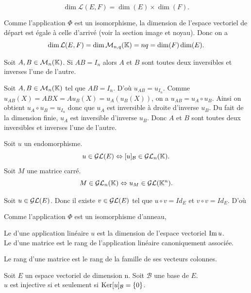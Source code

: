 \documentclass{book}
\begin{document}
\begin{Corollaire}
$$\dim \mathcal{L}(E,F) = \dim(E) \times\dim(F).$$
\end{Corollaire}
\begin{Demonstration}
Comme l'application $\Phi$ est un isomorphisme, la dimension de l'espace vectoriel de départ est égale à celle d'arrivé (voir la section image et noyau). Donc on a $$\dim \mathcal{L}(E,F)=\dim \M{n}{q}{\K}= n q= \dim (F)\dim (E).$$ 
\end{Demonstration}

\begin{Proposition}
Soit $A,B\in \MnK$.
Si $AB=I_n$ alors $A$ et $B$ sont toutes deux inversibles et inverses l'une de l'autre.
\end{Proposition}
\begin{Demonstration}
Soit $A,B\in \MnK$ tel que $AB=I_n$. D'où $u_{AB}=u_{I_n}$.  Comme $u_{AB}(X)=ABX=A u_{B}(X) =u_{A}( u_{B}(X))$, on a $u_{AB}=u_{A}\circ u_{B}$. Ainsi on obtient $u_{A}\circ u_{B}=u_{I_n}$ donc que  $u_{A}$ est inversible à droite d'inverse $u_{B}$. Du fait de la dimension finie,  $u_{A}$ est inversible d'inverse $u_{B}$. Donc $A$ et $B$ sont toutes deux inversibles et inverses l'une de l'autre.
\end{Demonstration}

\begin{Proposition}
Soit $u$ un endomorphisme. 
$$u\in\GLE\Leftrightarrow [u]_\mathcal{B}\in \GLnK.$$
Soit $M$ une matrice carré.
$$M \in \GLnK \Leftrightarrow u_M\in \GLE[\K^n] .$$
\end{Proposition}



\begin{Demonstration}
Soit $u\in\GLE$. Donc il existe $v\in\GLE$ tel que $u\circ v=Id_E$ et $v\circ v =Id_E$. D'où    

Comme l'application $\Phi$ est un isomorphisme d'anneau, 
\end{Demonstration}



\begin{Definition}[Rang] Le  d'une  application linéaire $u$ est  la dimension de l'espace vectoriel $\Ima u$.\\
Le  d'une matrice est le rang de l'application linéaire canoniquement associée.
\end{Definition}
\begin{Proposition} Le rang d'une matrice est le rang de la famille de ses vecteurs colonnes. 
\end{Proposition}
\begin{Proposition}[Dualité]
Soit $E$ un espace vectoriel de dimension n. Soit $\mathcal{B}$ une base de $E$. \\
$u$ est injective si et seulement si $\Ker [u]_\mathcal{B}=\{0\}$.
\end{Proposition}
\end{document}
